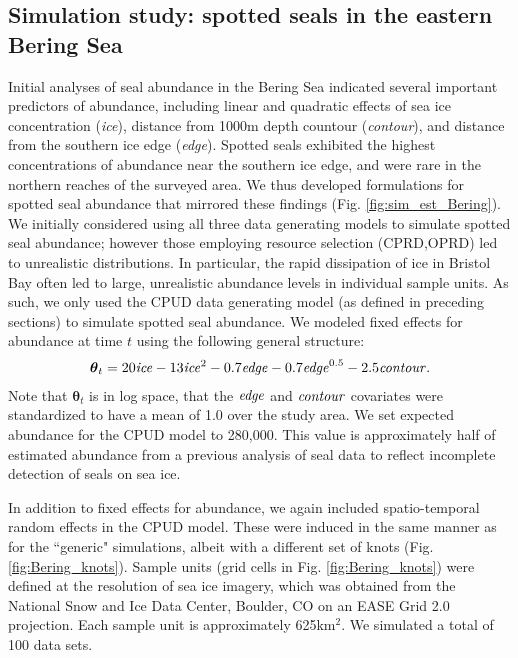 \documentclass[12pt,fleqn]{article}
\begin{document}
\begin{flushleft}
\section{Simulation study: spotted seals in the eastern Bering Sea}

Initial analyses of seal abundance in the Bering Sea \citep[e.g.][]{ConnEtAl2014,VerHoefEtAl2014} indicated several important predictors of abundance, including linear and quadratic effects of sea ice concentration ({\it ice}), distance from 1000m depth countour ({\it contour}), and distance from the southern ice edge ({\it edge}).  Spotted seals exhibited the highest concentrations of abundance near the southern ice edge, and were rare in the northern reaches of the surveyed area.  We thus developed formulations for spotted seal abundance that mirrored these findings (Fig. \ref{fig:sim_est_Bering}).  We initially considered using all three data generating models to simulate spotted seal abundance; however those employing resource selection (CPRD,OPRD) led to unrealistic distributions.  In particular, the rapid dissipation of ice in Bristol Bay often led to large, unrealistic abundance levels in individual sample units.  As such, we only used the CPUD data generating model (as defined in preceding sections) to simulate spotted seal abundance.  We modeled fixed effects for abundance at time $t$ using the following general structure:
\begin{eqnarray}
  \label{eq:seal_formula}
  \boldsymbol{\theta}_t = 20 {\it ice} - 13 {\it ice}^2 - 0.7 {\it edge} - 0.7 {\it edge}^{0.5} - 2.5 {\it contour}.
\end{eqnarray}
Note that $\boldsymbol{\theta}_t$ is in log space, that the ${\it edge}$ and ${\it contour}$ covariates were standardized to have a mean of 1.0 over the study area.  We set expected abundance for the CPUD model to 280,000.  This value is approximately half of estimated abundance from a previous analysis of seal data \citep{ConnEtAl2014} to reflect incomplete detection of seals on sea ice.




\hspace{.5in} In addition to fixed effects for abundance, we again included spatio-temporal random effects in the CPUD model.  These were induced in the same manner as for the ``generic" simulations, albeit with a different set of knots (Fig. \ref{fig:Bering_knots}).  Sample units (grid cells in Fig. \ref{fig:Bering_knots}) were defined at the resolution of sea ice imagery, which was obtained from the National Snow and Ice Data Center, Boulder, CO on an EASE Grid 2.0 projection.  Each sample unit is approximately 625km$^2$.  We simulated a total of 100 data sets.



\end{flushleft}
\end{document}
